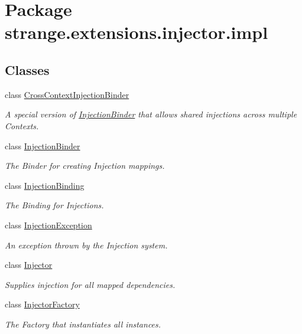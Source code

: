 \hypertarget{namespacestrange_1_1extensions_1_1injector_1_1impl}{\section{Package strange.\-extensions.\-injector.\-impl}
\label{namespacestrange_1_1extensions_1_1injector_1_1impl}
}
\subsection*{Classes}
\begin{DoxyCompactItemize}
\item 
class \hyperlink{classstrange_1_1extensions_1_1injector_1_1impl_1_1_cross_context_injection_binder}{Cross\-Context\-Injection\-Binder}
\begin{DoxyCompactList}\small\item\em A special version of \hyperlink{classstrange_1_1extensions_1_1injector_1_1impl_1_1_injection_binder}{Injection\-Binder} that allows shared injections across multiple Contexts. \end{DoxyCompactList}\item 
class \hyperlink{classstrange_1_1extensions_1_1injector_1_1impl_1_1_injection_binder}{Injection\-Binder}
\begin{DoxyCompactList}\small\item\em The Binder for creating Injection mappings. \end{DoxyCompactList}\item 
class \hyperlink{classstrange_1_1extensions_1_1injector_1_1impl_1_1_injection_binding}{Injection\-Binding}
\begin{DoxyCompactList}\small\item\em The Binding for Injections. \end{DoxyCompactList}\item 
class \hyperlink{classstrange_1_1extensions_1_1injector_1_1impl_1_1_injection_exception}{Injection\-Exception}
\begin{DoxyCompactList}\small\item\em An exception thrown by the Injection system. \end{DoxyCompactList}\item 
class \hyperlink{classstrange_1_1extensions_1_1injector_1_1impl_1_1_injector}{Injector}
\begin{DoxyCompactList}\small\item\em Supplies injection for all mapped dependencies. \end{DoxyCompactList}\item 
class \hyperlink{classstrange_1_1extensions_1_1injector_1_1impl_1_1_injector_factory}{Injector\-Factory}
\begin{DoxyCompactList}\small\item\em The Factory that instantiates all instances. \end{DoxyCompactList}\end{DoxyCompactItemize}
